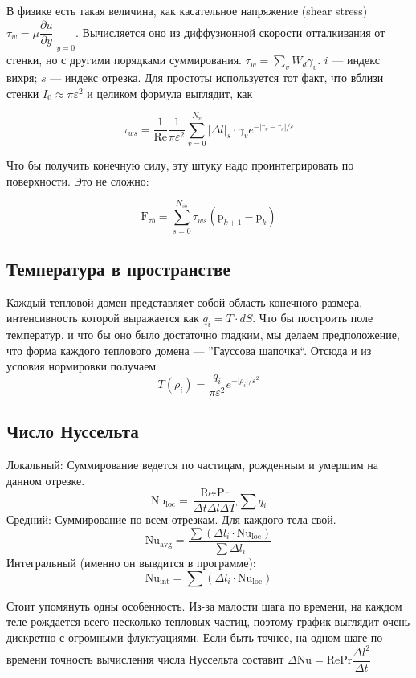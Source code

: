 \documentclass[a4paper,14pt]{extreport}
\newcommand{\br}[1]{\boldsymbol{\mathrm{#1}}}
\renewcommand{\vec}[1]{\br{#1}}
\newcommand{\Reyn}{\text{Re}}
\newcommand{\Pran}{\text{Pr}}
\newcommand{\Nuss}{\text{Nu}}
\begin{document}
В физике есть такая величина, как касательное напряжение (shear stress) $\tau_w = \mu \left. \dfrac{\partial u}{\partial y} \right|_{y=0}$. Вычисляется оно из диффузионной скорости отталкивания от стенки, но с другими порядками суммирования. $ \tau_w = \sum_v {W_d \gamma_v}$. $i$ --- индекс вихря; $s$ --- индекс отрезка. Для простоты используется тот факт, что вблизи стенки $I_0 \approx \pi\varepsilon^2$ и целиком формула выглядит, как

$$ \tau_{ws} = \dfrac{1}{\Reyn}\dfrac{1}{\pi\varepsilon^2} \sum\limits_{v=0}^{N_v} |\Delta l|_s\cdot \gamma_v e^{-\lvert\vec r_v- \vec r_s\rvert/\varepsilon}$$

Что бы получить конечную силу, эту штуку надо проинтегрировать по поверхности. Это не сложно:

$$ \br F_{\tau b} = \sum_{s=0}^{N_{sb}} {\tau_{ws} (\br p_{k+1} - \br p_k) } $$

\subsection{Температура в пространстве}
Каждый тепловой домен представляет собой область конечного размера, интенсивность которой выражается как $q_i = T \cdot dS$. Что бы построить поле температур, и что бы оно было достаточно гладким, мы делаем предположение, что форма каждого теплового домена --- ''Гауссова шапочка``. Отсюда и из условия нормировки получаем
$$T(\rho_i) = \dfrac{q_i}{\pi \varepsilon^2} e^{-\lvert \rho_i \rvert / \varepsilon^2}$$

\subsection{Число Нуссельта}

Локальный: Суммирование ведется по частицам, рожденным и умершим на данном отрезке.
$$\Nuss_\text{loc} = \dfrac{\Reyn \cdot \Pran}{\Delta t \Delta l \Delta T} \sum q_i$$
Средний: Суммирование по всем отрезкам. Для каждого тела свой.
$$\Nuss_\text{avg} = \dfrac{\sum (\Delta l_i \cdot \Nuss_\text{loc})}{\sum \Delta l_i}$$
Интегральный (именно он вывдится в программе):
$$\Nuss_\text{int} = \sum ( \Delta l_i \cdot \Nuss_\text{loc})$$

Стоит упомянуть одны особенность. Из-за малости шага по времени, на каждом теле рождается всего несколько тепловых частиц, поэтому график выглядит очень дискретно с огромными флуктуациями. Если быть точнее, на одном шаге по времени точность вычисления числа Нуссельта составит $\Delta \Nuss = \Reyn \Pran \dfrac{\Delta l^2}{\Delta t }$
\end{document}

